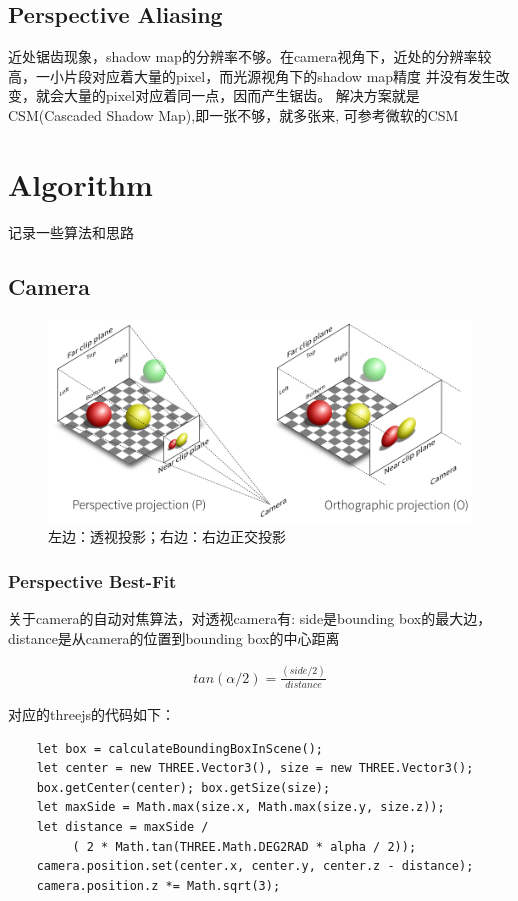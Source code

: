 \section{Perspective Aliasing}
近处锯齿现象，shadow map的分辨率不够。在camera视角下，近处的分辨率较高，一小片段对应着大量的pixel，而光源视角下的shadow map精度
并没有发生改变，就会大量的pixel对应着同一点，因而产生锯齿。 解决方案就是CSM(Cascaded Shadow Map),即一张不够，就多张来,
可参考微软的CSM\cite{CSM-msdn}


\chapter{Algorithm}
记录一些算法和思路

\section{Camera}

\begin{figure}[h]
    \centering
    \includegraphics[width=1\textwidth]{images/camera-perspective-and-orthographic.png}
    \caption{左边：透视投影；右边：右边正交投影}    
\end{figure}

\subsection{Perspective Best-Fit}
关于camera的自动对焦算法，对透视camera有: side是bounding box的最大边， distance是从camera的位置到bounding box的中心距离

\begin{align*}
    tan(\alpha / 2) = \frac{(side / 2)}{distance}
\end{align*}

对应的threejs的代码如下：

\begin{lstlisting}
    let box = calculateBoundingBoxInScene();
    let center = new THREE.Vector3(), size = new THREE.Vector3();
    box.getCenter(center); box.getSize(size);
    let maxSide = Math.max(size.x, Math.max(size.y, size.z));    
    let distance = maxSide /
         ( 2 * Math.tan(THREE.Math.DEG2RAD * alpha / 2));  
    camera.position.set(center.x, center.y, center.z - distance);
    camera.position.z *= Math.sqrt(3);
\end{lstlisting}

